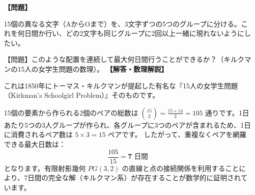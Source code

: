 \documentclass[10pt,a4paper,oneside,openany]{ltjsbook}
\begin{document}
\begin{tcolorbox}[colback=softblue,colframe=primaryblue,title=\textbf{第 271 問：十五文字の配置パズル（キルクマンの女学生問題の変形） （原題: FIFTEEN LETTER PUZZLE.）},arc=2mm,boxrule=1pt,breakable]
\textbf{【問題】}\par\vspace{0.3em}
15個の異なる文字（AからOまで）を、3文字ずつの5つのグループに分ける。これを何日間か行い、どの2文字も同じグループに2回以上一緒に現れないようにしたい。

【問題】このような配置を連続して最大何日間行うことができるか？（キルクマンの15人の女学生問題の数理）。
\tcblower
\textbf{【解答・数理解説】}\par\vspace{0.3em}
これは1850年にトーマス・キルクマンが提起した有名な『15人の女学生問題（Kirkman's Schoolgirl Problem）』そのものです。

15個の要素から作られる2個のペアの総数は $\binom{15}{2} = \frac{15 \times 14}{2} = 105$ 通りです。1日あたり5つの3人グループが作られ、各グループに3つのペアが含まれるため、1日に消費されるペア数は $5 \times 3 = 15$ ペアです。
したがって、重複なくペアを網羅できる最大日数は：
\[ \frac{105}{15} = \mathbf{7 \text{ 日間}} \]
となります。有限射影幾何 $PG(3, 2)$ の直線と点の接続関係を利用することにより、7日間の完全な解（キルクマン系）が存在することが数学的に証明されています。
\end{tcolorbox}
\end{document}
